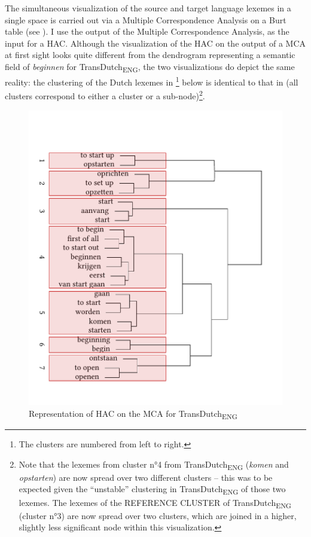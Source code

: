 The simultaneous visualization of the source and target language lexemes in a single space is carried out via a Multiple Correspondence Analysis on a Burt table \citep{greenacre_simple_2006, greenacre_correspondence_2007} (see ). I use the output of the Multiple Correspondence Analysis, as the input for a HAC. Although the visualization of the HAC on the output of a MCA at first sight looks quite different from the dendrogram representing a semantic field of \textit{beginnen} for TransDutch\textsubscript{ENG}, the two visualizations do depict the same reality: the clustering of the Dutch lexemes in \footnote{The clusters are numbered from left to right.} below is identical to that in  (all clusters correspond to either a cluster or a sub-node)\footnote{Note that the lexemes from cluster n°4 from TransDutch\textsubscript{ENG} (\textit{komen} and \textit{opstarten}) are now spread over two different clusters – this was to be expected given the ``unstable'' clustering in TransDutch\textsubscript{ENG} of those two lexemes. The lexemes of the REFERENCE CLUSTER of TransDutch\textsubscript{ENG} (cluster n°3) are now spread over two clusters, which are joined in a higher, slightly less significant node within this visualization.}.

\begin{figure}
\includegraphics[width=\textwidth]{figures/tree92.pdf}
\caption{\label{fig:4:89}  Representation of HAC on the MCA for TransDutch\textsubscript{ENG}}
\end{figure}

